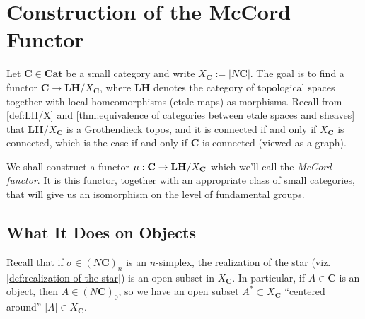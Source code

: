 %
%

\chapter{Construction of the McCord Functor}

Let $\mathbf{C} \in \mathbf{Cat}$ be a small category and write $X_\mathbf{C} := |N\mathbf{C}|$. The goal is to find a functor $\mathbf{C} \to \mathbf{LH}/X_\mathbf{C}$, where $\mathbf{LH}$ denotes the category of topological spaces together with local homeomorphisms (etale maps) as morphisms. Recall from \cref{def:LH/X} and \cref{thm:equivalence of categories between etale spaces and sheaves} that $\mathbf{LH}/X_{\mathbf{C}}$ is a Grothendieck topos, and it is connected if and only if $X_{\mathbf{C}}$ is connected, which is the case if and only if $\mathbf{C}$ is connected (viewed as a graph).

We shall construct a functor $\operatorname{\mu} : \mathbf{C} \to \mathbf{LH}/X_{\mathbf{C}}$ which we'll call the \emph{McCord functor}. It is this functor, together with an appropriate class of small categories, that will give us an isomorphism on the level of fundamental groups.

\section{What It Does on Objects}

Recall that if $\sigma \in (N\mathbf{C})_n$ is an $n$-simplex, the realization of the star (viz. \cref{def:realization of the star}) is an open subset in $X_{\mathbf{C}}$. In particular, if $A \in \mathbf{C}$ is an object, then $A \in (N\mathbf{C})_0$, so we have an open subset $A^* \subset X_{\mathbf{C}}$ ``centered around'' $|A| \in X_{\mathbf{C}}$.


